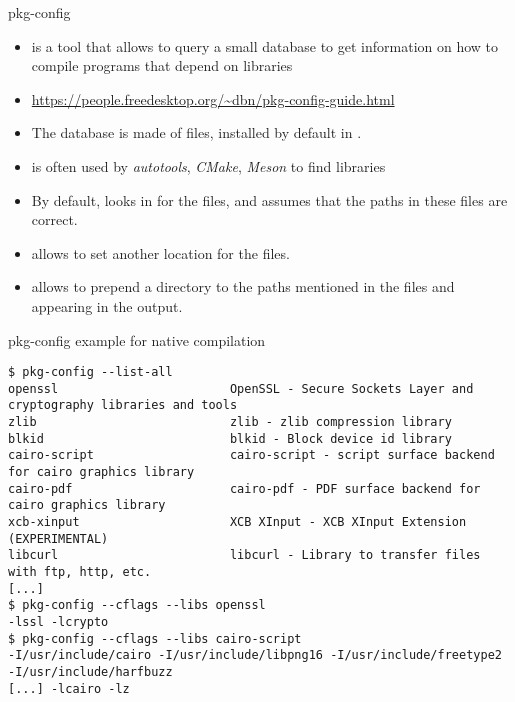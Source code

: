 \begin{frame}{pkg-config}
  \begin{itemize}
  \item {} is a tool that allows to query a small
    database to get information on how to compile programs that depend
    on libraries
  \item \url{https://people.freedesktop.org/~dbn/pkg-config-guide.html}
  \item The database is made of  files, installed by default in
    .
  \item {} is often used by {\em autotools}, {\em
      CMake}, {\em Meson} to find libraries
  \item By default,  looks in
     for the  files, and assumes
    that the paths in these files are correct.
  \item {} allows to set another location for the
     files.
  \item {} allows to prepend a directory to the
    paths mentioned in the  files and appearing in the
     output.
  \end{itemize}
\end{frame}

\begin{frame}[fragile]{pkg-config example for native compilation}
  \begin{block}{}
    {\scriptsize
\begin{verbatim}
$ pkg-config --list-all
openssl                        OpenSSL - Secure Sockets Layer and cryptography libraries and tools
zlib                           zlib - zlib compression library
blkid                          blkid - Block device id library
cairo-script                   cairo-script - script surface backend for cairo graphics library
cairo-pdf                      cairo-pdf - PDF surface backend for cairo graphics library
xcb-xinput                     XCB XInput - XCB XInput Extension (EXPERIMENTAL)
libcurl                        libcurl - Library to transfer files with ftp, http, etc.
[...]
$ pkg-config --cflags --libs openssl
-lssl -lcrypto
$ pkg-config --cflags --libs cairo-script
-I/usr/include/cairo -I/usr/include/libpng16 -I/usr/include/freetype2 -I/usr/include/harfbuzz
[...] -lcairo -lz
\end{verbatim}
    }
  \end{block}
\end{frame}

